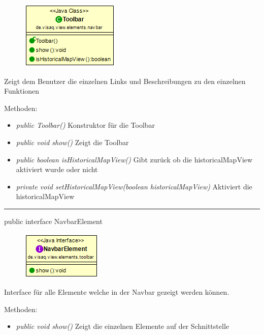 \begin{minipage}{0.3\textwidth}
    \begin{figure}[H]
        \includegraphics[scale = 0.6]{media/frontend/view/de.view.elements.navbar/ToolbarClass.png}
    \end{figure}
    \end{minipage} \hfill
    \begin{minipage}{0.6\textwidth}
Zeigt dem Benutzer die einzelnen Links und Beschreibungen zu den einzelnen Funktionen
\end{minipage}

Methoden:
\begin{itemize}
    \item \emph{public Toolbar()} Konstruktor für die Toolbar
    \item \emph{public void show()} Zeigt die Toolbar
    \item \emph{public boolean isHistoricalMapView()} Gibt zurück ob die historicalMapView aktiviert wurde oder nicht
    \item \emph{private void setHistoricalMapView(boolean historicalMapView)} Aktiviert die historicalMapView
\end{itemize}

\rule{\textwidth}{0.4pt}
public interface NavbarElement

\begin{minipage}{0.3\textwidth}
    \begin{figure}[H]
        \includegraphics[scale = 0.7]{media/frontend/view/de.view.elements.navbar/NavbarElementClass.png}
    \end{figure}
\end{minipage} \hfill
\begin{minipage}{0.6\textwidth}
Interface für alle Elemente welche in der Navbar gezeigt werden können.
\end{minipage}

Methoden:
\begin{itemize}
    \item \emph{public void show()} Zeigt die einzelnen Elemente auf der Schnittstelle
\end{itemize}

